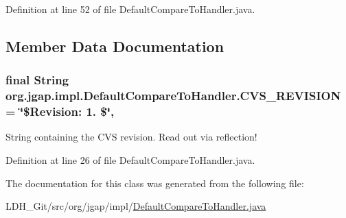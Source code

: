 Definition at line 52 of file Default\-Compare\-To\-Handler.\-java.



\subsection{Member Data Documentation}
\hypertarget{classorg_1_1jgap_1_1impl_1_1_default_compare_to_handler_af64ba608cee422cadaa3b978190f8777}{
\subsubsection[{C\-V\-S\-\_\-\-R\-E\-V\-I\-S\-I\-O\-N}]{\setlength{\rightskip}{0pt plus 5cm}final String org.\-jgap.\-impl.\-Default\-Compare\-To\-Handler.\-C\-V\-S\-\_\-\-R\-E\-V\-I\-S\-I\-O\-N = \char`\"{}\$Revision\-: 1. \$\char`\"{}\hspace{0.3cm}{\ttfamily [static]}, {\ttfamily [private]}}}\label{classorg_1_1jgap_1_1impl_1_1_default_compare_to_handler_af64ba608cee422cadaa3b978190f8777}
String containing the C\-V\-S revision. Read out via reflection! 

Definition at line 26 of file Default\-Compare\-To\-Handler.\-java.



The documentation for this class was generated from the following file\-:\begin{DoxyCompactItemize}
\item 
L\-D\-H\-\_\-\-Git/src/org/jgap/impl/\hyperlink{_default_compare_to_handler_8java}{Default\-Compare\-To\-Handler.\-java}\end{DoxyCompactItemize}
